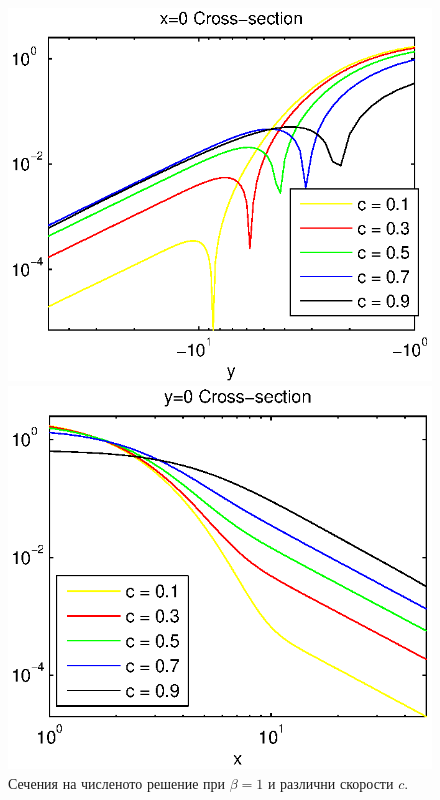 \documentclass{article}
\begin{document}
\begin{figure}[ht]
\begin{minipage}[b]{0.5\linewidth}
	\end{minipage}
	\begin{minipage}[b]{0.5\linewidth}
		\raggedleft
		\includegraphics[width=\linewidth]{../EllipticEquationSJC/cross-sections/c=01__09beta=1Logx=0.eps}
	\end{minipage}	
	\begin{minipage}[b]{0.5\linewidth}
		\raggedright
		 \includegraphics[width=\linewidth]{../EllipticEquationSJC/cross-sections/c=01__09beta=1Logy=0.eps}
	\end{minipage}
	\caption{Сечения на численото решение при $\beta=1$ и различни скорости $c$.}
	\label{profilesSpeedVarying}
\end{figure}
\end{document}
